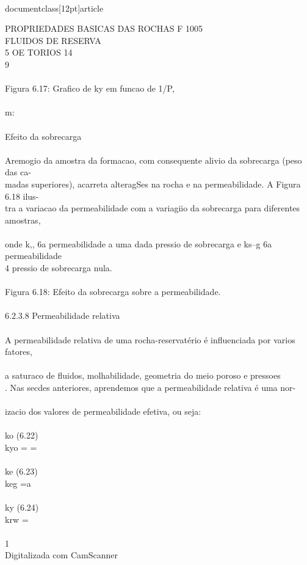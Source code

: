 \\documentclass[12pt]{article}
\begin{document}
PROPRIEDADES BASICAS DAS ROCHAS F 1005\\
FLUIDOS DE RESERVA\\
5 OE TORIOS 14\\
9\\
\\
Figura 6.17: Grafico de ky em funcao de 1/P,\\
\\
m:\\
\\
Efeito da sobrecarga\\
\\
Aremogio da amostra da formacao, com consequente alivio da sobrecarga (peso das ca-\\
madas superiores), acarreta alteragSes na rocha e na permeabilidade. A Figura 6.18 ilus-\\
tra a variacao da permeabilidade com a variagiio da sobrecarga para diferentes amostras,\\
\\
onde k,, 6a permeabilidade a uma dada pressio de sobrecarga e ks--g 6a permeabilidade\\
4 pressio de sobrecarga nula.\\
\\
Figura 6.18: Efeito da sobrecarga sobre a permeabilidade.\\
\\
6.2.3.8 Permeabilidade relativa\\
\\
A permeabilidade relativa de uma rocha-reservatério é influenciada por varios fatores,\\
\\
a saturaco de fluidos, molhabilidade, geometria do meio poroso e pressoes\\
. Nas secdes anteriores, aprendemos que a permeabilidade relativa é uma nor-\\
\\
izacio dos valores de permeabilidade efetiva, ou seja:\\
\\
ko (6.22)\\
kyo = =\\
\\
ke (6.23)\\
keg =a\\
\\
ky (6.24)\\
krw =\\
\\
1\\
Digitalizada com CamScanner\\
\end{document}
